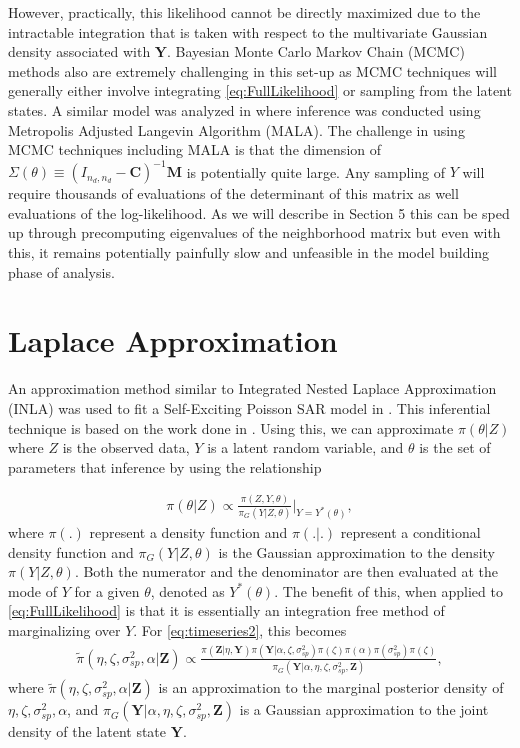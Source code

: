 \documentclass[11pt]{isuthesis}
\begin{document}
	However, practically, this likelihood cannot be directly maximized due to the intractable integration that is taken with respect to the multivariate Gaussian density associated with $\boldsymbol{Y}$.   Bayesian Monte Carlo Markov Chain (MCMC) methods also are extremely challenging in this set-up as MCMC techniques will generally either involve integrating \eqref{eq:FullLikelihood} or sampling from the latent states.  A similar model was analyzed in \cite{mohler2013modeling} where inference was conducted using Metropolis Adjusted Langevin Algorithm (MALA).  The challenge in using MCMC techniques including MALA is that the dimension of $\Sigma(\theta) \equiv (I_{n_d,n_d}-\boldsymbol{C})^{-1}\boldsymbol{M}$ is potentially quite large.  Any sampling of $Y$ will require thousands of evaluations of the determinant of this matrix as well evaluations of the log-likelihood.  As we will describe in Section 5 this can be sped up through precomputing eigenvalues of the neighborhood matrix but even with this, it remains potentially painfully slow and unfeasible in the model building phase of analysis.
	
	\section{Laplace Approximation}
	
	An approximation method similar to Integrated Nested Laplace Approximation (INLA) was used to fit a Self-Exciting Poisson SAR model in \cite{2017arXiv170308429C}.  This inferential technique is based on the work done in \cite{tierney1986accurate}.  Using this, we can approximate $\pi(\theta|Z)$ where $Z$ is the observed data, $Y$ is a latent random variable, and $\theta$ is the set of parameters that inference by using the relationship
	
	\begin{align}
	\pi(\theta|Z)\propto \frac{ \pi(Z,Y,\theta)}{\pi_G(Y|Z,\theta)}\bigg\rvert_{Y=Y^*(\theta)},
	\end{align}
	where $\pi(.)$ represent a density function and $\pi(.|.)$ represent a conditional density function and $\pi_G(Y|Z,\theta)$ is the Gaussian approximation to the density $\pi(Y|Z,\theta)$. Both the numerator and the denominator are then evaluated at the mode of $Y$ for a given $\theta$, denoted as $Y^*(\theta)$.  The benefit of this, when applied to \eqref{eq:FullLikelihood} is that it is essentially an integration free method of marginalizing over $Y$.  For \eqref{eq:timeseries2}, this becomes
	\begin{align}
	\tilde{\pi}(\eta,\zeta,\sigma_{sp}^2,\alpha|\boldsymbol{Z})\propto \frac{\pi(\boldsymbol{Z}|\eta,\boldsymbol{Y})\pi(\boldsymbol{Y}|\alpha,\zeta,\sigma_{sp}^2)\pi(\zeta)\pi(\alpha)\pi(\sigma_{sp}^2)\pi(\zeta)}{\pi_G(\boldsymbol{Y}|\alpha,\eta,\zeta,\sigma_{sp}^2,\boldsymbol{Z})} \label{eq:INLA},
	\end{align}
	where $\tilde{\pi}(\eta,\zeta,\sigma_{sp}^2,\alpha|\boldsymbol{Z})$ is an approximation to the marginal posterior density of $\eta,\zeta,\sigma_{sp}^2,\alpha$, and $\pi_G(\boldsymbol{Y}|\alpha,\eta,\zeta,\sigma_{sp}^2,\boldsymbol{Z})$ is a Gaussian approximation to the joint density of the latent state $\boldsymbol{Y}$. 
	
\end{document}
